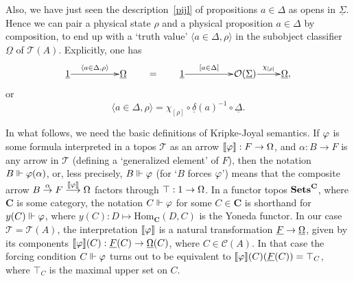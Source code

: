 \documentclass[11pt]{article}
\newcommand{\beq}{\begin{equation}}
\newcommand{\eeq}{\end{equation}}
\newcommand{\Sets}{\mbox{\textbf{Sets}}}
\newcommand{\raw}{\rightarrow} \newcommand{\rat}{\mapsto}
\newcommand{\inv}{^{-1}}
\newcommand{\er}{\eqref}
\newcommand{\al}{\alpha} \newcommand{\bt}{\beta}
\newcommand{\dl}{\delta} \newcommand{\Dl}{\Delta}
\newcommand{\rh}{\rho} \newcommand{\sg}{\sigma}
\newcommand{\ch}{\chi} \newcommand{\ps}{\psi} \newcommand{\Ps}{\Psi}
\newcommand{\CA}{{\mathcal A}} \newcommand{\CB}{{\mathcal B}}
\newcommand{\CO}{{\mathcal O}} \newcommand{\CP}{{\mathcal P}}
\newcommand{\CT}{{\mathcal T}} \newcommand{\CV}{{\mathcal V}}
\newcommand{\alg}[1]{\ensuremath{#1}}
\newcommand{\functor}[1]{\ensuremath{\underline{#1}}}
\newcommand{\context}{\ensuremath{\mathcal{C}}}
\newcommand{\asstopos}{\ensuremath{\mathcal{T}}}
\newcommand{\interpretation}[1]{\ensuremath{\llbracket{#1}\rrbracket}}
\renewcommand{\CA}{\mathcal{C}(A)}
\newcommand{\TA}{\mathcal{T}(A)}
\newcommand{\ulS}{\functor{\Sigma}}
\renewcommand{\TA}{\asstopos(\alg{A})}
\renewcommand{\CA}{\context(\alg{A})}
\begin{document}
Also, we have just seen the description~\er{pijl} of propositions
$a\in\Dl$ as opens in $\ulS$. Hence we can pair a physical state
$\rho$ and a physical proposition $a \in \Delta$ by composition, to
end up with a `truth value' $\langle a \in \Delta, \rho \rangle$  in
the subobject classifier $\functor{\Omega}$ of $\TA$. Explicitly, one
has
\beq
  \xymatrix@1{\underline{1} \ar^-{\langle a \in \Delta, \rho
  \rangle}[rr] && \functor{\Omega}}
  \qquad = \qquad
  \xymatrix@1{\underline{1} \ar^-{[a \in \Delta]}[rr] && \CO(\ulS)
  \ar^-{\ch_{[\rh]}}[r] & \functor{\Omega},}
  \label{eq:pairing}
\eeq
 or
 \beq \langle a \in \Delta, \rho \rangle=\ch_{[\rh]}\circ \underline{\dl}(a)\inv\circ\underline{\Delta}.\eeq

In what follows, we need the basic definitions of  Kripke-Joyal semantics. If $\varphi$ is some formula
interpreted in a  topos $\CT$ as an arrow $\interpretation{\phv}:F\raw\Om$, and $\al:B\raw F$ is any arrow in $\CT$ (defining a `generalized element' of $F$), then the notation  $B\Vdash\phv(\al)$, or, less precisely,  $B\Vdash\varphi$ (for `$B$ forces $\varphi$') means that the composite arrow
$B \stackrel{\al}{\raw} F\stackrel{\interpretation{\phv}}{\longrightarrow} \Om$ factors through
$\top:1\raw\Om$. In a functor topos $\Sets^{\mathbf{C}}$, where $\mathbf{C}$ is some category, the notation $C\Vdash \varphi$ for some $C\in\mathbf{C}$ is shorthand for
$y(C)\Vdash \varphi$, where $y(C):D\mapsto \mathrm{Hom}_{\mathbf{C}}(D,C)$ is the Yoneda functor. In our case $\CT=\TA$, the interpretation $\interpretation{\phv}$ is
a natural transformation $\underline{F}\raw\underline{\Om}$,
given by its components $\interpretation{\phv}(C): \underline{F}(C)\raw
\underline{\Om}(C)$, where $C\in\CA$. In that case the forcing condition
$C\Vdash \varphi$ turns out to be
equivalent to  $\interpretation{\phv}(C)(\underline{F}(C))=\top_C$, where $\top_C$ is the maximal upper set on $C$.
\end{document}
